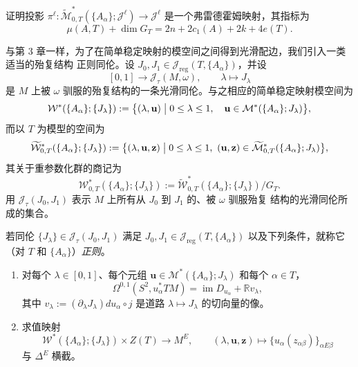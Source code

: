 \begin{exercise}\label{ex:6-2-9}
证明投影
$\pi^\ell:\widetilde{\mathcal M}^*_{0,T}
(\{A_\alpha\};\mathcal J^\ell)\to\mathcal J^\ell$
是一个弗雷德霍姆映射，其指标为
\[
  \mu(A,T)+\dim G_T
  =2n+2c_1(A)+2k+4e(T).
\]
\end{exercise}

与第 3 章一样，为了在简单稳定映射的模空间之间得到光滑配边，我们引入一类适当的殆复结构
正则同伦。设 $J_0,J_1\in\mathcal J_{\mathrm{reg}}(T,\{A_\alpha\})$，并设
\[
  [0,1]\longrightarrow\mathcal J_\tau(M,\omega),
  \qquad \lambda\longmapsto J_\lambda
\]
是 $M$ 上被 $\omega$ 驯服的殆复结构的一条光滑同伦。与之相应的简单稳定映射模空间为
\[
  \mathcal W^*(\{A_\alpha\};\{J_\lambda\})
  :=\bigl\{(\lambda,\mathbf u)\bigm|
  0\le\lambda\le1,\quad
  \mathbf u\in\mathcal M^*(\{A_\alpha\};J_\lambda)\bigr\},
\]
而以 $T$ 为模型的空间为
\[
  \widetilde{\mathcal W}^*_{0,T}(\{A_\alpha\};\{J_\lambda\})
  :=\bigl\{(\lambda,\mathbf u,\mathbf z)\bigm|
  0\le\lambda\le1,
  \ (\mathbf u,\mathbf z)\in
  \widetilde{\mathcal M}^*_{0,T}(\{A_\alpha\};J_\lambda)\bigr\},
\]
其关于重参数化群的商记为
\[
  \mathcal W^*_{0,T}(\{A_\alpha\};\{J_\lambda\})
  :=\widetilde{\mathcal W}^*_{0,T}(\{A_\alpha\};\{J_\lambda\})/G_T.
\]
用 $\mathcal J_\tau(J_0,J_1)$ 表示 $M$ 上所有从 $J_0$ 到 $J_1$ 的、被 $\omega$ 驯服殆复
结构的光滑同伦所成的集合。

\begin{definition}\label{def:6-2-10}
若同伦 $\{J_\lambda\}\in\mathcal J_\tau(J_0,J_1)$ 满足
$J_0,J_1\in\mathcal J_{\mathrm{reg}}(T,\{A_\alpha\})$ 以及下列条件，就称它（对
$T$ 和 $\{A_\alpha\}$）\emph{正则}。
\begin{enumerate}[label=(\roman*),leftmargin=3em]
\item 对每个 $\lambda\in[0,1]$、每个元组
$\mathbf u\in\mathcal M^*(\{A_\alpha\};J_\lambda)$ 和每个 $\alpha\in T$，
\[
  \Omega^{0,1}(S^2,u_\alpha^*TM)
  =\operatorname{im}D_{u_\alpha}+\mathbb R v_\lambda,
\]
其中
$v_\lambda:=(\partial_\lambda J_\lambda)du_\alpha\circ j$
是道路 $\lambda\mapsto J_\lambda$ 的切向量的像。
\item {}求值映射
\[
  \mathcal W^*(\{A_\alpha\};\{J_\lambda\})\times Z(T)
  \longrightarrow M^E,
  \qquad
  (\lambda,\mathbf u,\mathbf z)
  \longmapsto\{u_\alpha(z_{\alpha\beta})\}_{\alpha E\beta}
\]
与 $\Delta^E$ 横截。
\end{enumerate}
\end{definition}

